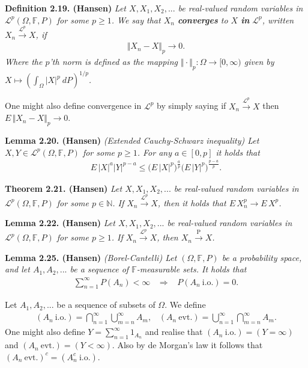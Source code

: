 \documentclass[
]{book}
\begin{document}
\textbf{Definition 2.19. (Hansen)} \emph{Let \(X,X_1,X_2,...\) be real-valued random variables in \(\mathcal{L}^p(\Omega,\mathbb{F},P)\) for some \(p\ge 1\). We say that \(X_n\) \textbf{converges} to \(X\) \textbf{in} \(\mathcal{L}^p\), written \(X_n\stackrel{\mathcal{L}^p}{\to} X\), if}
\begin{align*}
    \Vert X_n - X\Vert_p\to 0.\tag{2.27}
\end{align*}
\emph{Where the \(p\)'th norm is defined as the mapping \(\Vert \cdot \Vert_p : \Omega\to [0,\infty)\) given by \(X\mapsto \left(\int_\Omega \vert X\vert ^p\ dP\right)^{1/p}\).}

One might also define convergence in \(\mathcal{L}^p\) by simply saying if \(X_n\stackrel{\mathcal{L}^p}{\to} X\) then \(E\,\Vert X_n-X\Vert_p\to 0\).

\textbf{Lemma 2.20. (Hansen)} \emph{(Extended Cauchy-Schwarz inequality) Let \(X,Y\in\mathcal{L}^p(\Omega,\mathbb{F},P)\) for some \(p\ge 1\). For any \(a\in[0,p]\) it holds that}
\begin{align*}
    E\, \vert X\vert^a\vert Y\vert^{p-a}\le \Big(E\, \vert X\vert^p\Big)^{\frac{a}{p}}\Big(E\, \vert Y\vert^p\Big)^{\frac{p-a}{p}}.\tag{2.29}
\end{align*}

\textbf{Theorem 2.21. (Hansen)} \emph{Let \(X,X_1,X_2,...\) be real-valued random variables in \(\mathcal{L}^p(\Omega,\mathbb{F},P)\) for some \(p\in\mathbb{N}\). If \(X_n\stackrel{\mathcal{L}^p}{\to} X\), then it holds that \(E\, X_n^p\to E\, X^p\).}

\textbf{Lemma 2.22. (Hansen)} \emph{Let \(X,X_1,X_2,...\) be real-valued random variables in \(\mathcal{L}^p(\Omega,\mathbb{F},P)\) for some \(p\ge 1\). If \(X_n\stackrel{\mathcal{L}^p}{\to} X\), then \(X_n\stackrel{\text{P}}{\to} X\).}

\textbf{Lemma 2.25. (Hansen)} \emph{(Borel-Cantelli) Let \((\Omega,\mathbb{F},P)\) be a probability space, and let \(A_1,A_2,...\) be a sequence of \(\mathbb{F}\)-measurable sets. It holds that}
\begin{align*}
    \sum_{n=1}^\infty P(A_n)<\infty\hspace{10pt}\Rightarrow\hspace{10pt}P(A_n\ \text{i.o.})=0.
\end{align*}

Let \(A_1,A_2,...\) be a sequence of subsets of \(\Omega\). We define
\begin{align*}
    (A_n\ \text{i.o.})=\bigcap_{n=1}^\infty\bigcup_{m=n}^\infty A_m,\hspace{10pt}(A_n\ \text{evt.})=\bigcup_{n=1}^\infty\bigcap_{m=n}^\infty A_m.
\end{align*}
One might also define \(Y=\sum_{n=1}^\infty 1_{A_n}\) and realise that \((A_n\ \text{i.o.})=(Y=\infty)\) and \((A_n\ \text{evt.})=(Y<\infty)\). Also by de Morgan's law it follows that \((A_n\ \text{evt.})^c=(A_n^c\ \text{i.o.})\).
\end{document}
